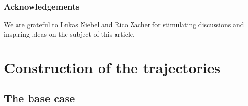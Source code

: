 \documentclass[10pt,a4paper]{amsart}
\theoremstyle{definition}
\begin{document}
\subsubsection*{Acknowledgements}
We are grateful to Lukas Niebel and Rico Zacher for stimulating discussions and inspiring ideas on the subject of this article.

\section{Construction of the trajectories}
\label{sec:trajectories}

\subsection{The base case}
\label{sec:toy-local}
\end{document}
